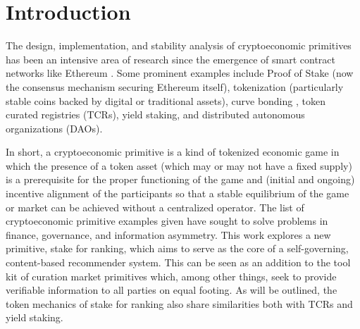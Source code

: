 \section{Introduction}

The design, implementation, and stability analysis of cryptoeconomic primitives \cite{horne2018crypto} has been an intensive area of research since the emergence of smart contract networks like Ethereum \cite{buterin2014next}. Some prominent examples include Proof of Stake \cite{quantum2011bitcoin} (now the consensus mechanism securing Ethereum itself), tokenization (particularly stable coins backed by digital or traditional assets), curve bonding \cite{graphBondingCurve}, token curated registries \cite{Goldin2018TCR} (TCRs), yield staking, and distributed autonomous organizations \cite{merkle2016daos} (DAOs). 

In short, a cryptoeconomic primitive is a kind of tokenized economic game in which the presence of a token asset (which may or may not have a fixed supply) is a prerequisite for the proper functioning of the game and (initial and ongoing) incentive alignment of the participants so that a stable equilibrium of the game or market can be achieved without a centralized operator. The list of cryptoeconomic primitive examples given have sought to solve problems in finance, governance, and information asymmetry. This work explores a new primitive, stake for ranking, which aims to serve as the core of a self-governing, content-based recommender system. This can be seen as an addition to the tool kit of curation market primitives which, among other things, seek to provide verifiable information to all parties on equal footing. As will be outlined, the token mechanics of stake for ranking also share similarities both with TCRs and yield staking. 